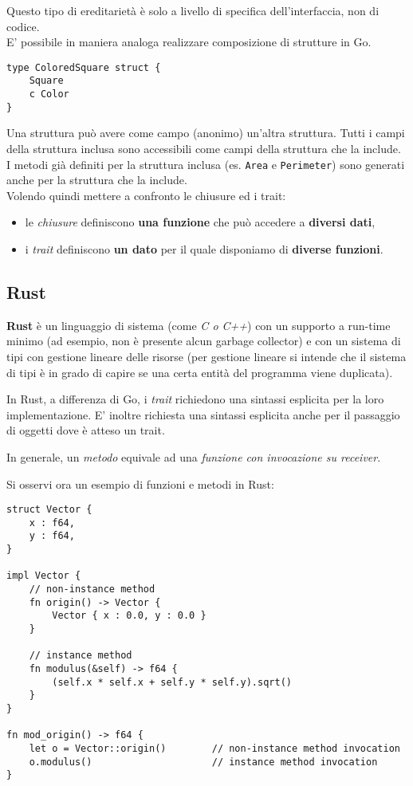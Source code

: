 \documentclass{article}
\begin{document}
Questo tipo di ereditarietà è solo a livello di specifica dell'interfaccia, non di codice.\vspace{14pt}\\
E' possibile in maniera analoga realizzare composizione di strutture in Go.
\begin{tcolorbox}
\begin{verbatim}
type ColoredSquare struct {
    Square
    c Color
}
\end{verbatim}
\end{tcolorbox}
Una struttura può avere come campo (anonimo) un’altra struttura. Tutti i campi della struttura inclusa sono accessibili come campi della struttura che la include.\\
I metodi già definiti per la struttura inclusa (es. \texttt{Area} e \texttt{Perimeter}) sono generati anche per la struttura che la include.\vspace{14pt}\\
Volendo quindi mettere a confronto le chiusure ed i trait:
\begin{itemize}
    \item le \textit{chiusure} definiscono \textbf{una funzione} che può accedere a \textbf{diversi dati},
    \item i \textit{trait} definiscono \textbf{un dato} per il quale disponiamo di \textbf{diverse funzioni}.
\end{itemize}

\pagebreak

\subsection*{Rust}
\textbf{Rust} è un linguaggio di sistema (come \textit{C o C++}) con un supporto a run-time minimo (ad esempio, non è presente alcun garbage collector) e con un sistema di tipi con gestione lineare delle risorse (per gestione lineare si intende che il sistema di tipi è in grado di capire se una certa entità del programma viene duplicata).

In Rust, a differenza di Go, i \textit{trait} richiedono una sintassi esplicita per la loro implementazione. E' inoltre richiesta una sintassi esplicita anche per il passaggio di oggetti dove è atteso un trait.

In generale, un \textit{metodo} equivale ad una \textit{funzione con invocazione su receiver}.

Si osservi ora un esempio di funzioni e metodi in Rust:
\begin{tcolorbox}
\begin{verbatim}
struct Vector {
    x : f64,
    y : f64,
}

impl Vector {
    // non-instance method
    fn origin() -> Vector {         
        Vector { x : 0.0, y : 0.0 }
    }

    // instance method
    fn modulus(&self) -> f64 {      
        (self.x * self.x + self.y * self.y).sqrt()
    }
}

fn mod_origin() -> f64 {
    let o = Vector::origin()        // non-instance method invocation
    o.modulus()                     // instance method invocation
}
\end{verbatim}
\end{tcolorbox}
\end{document}
